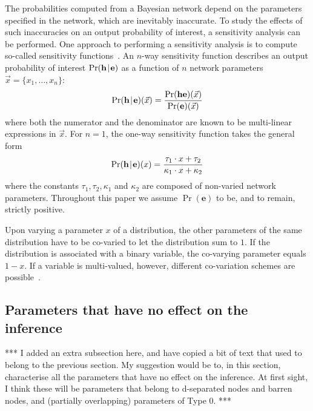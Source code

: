 \documentclass[10pt,a4paper]{paper}
\theoremstyle{definition}
\newcommand{\ct}[1]{\tau_{#1}}
\newcommand{\cn}[1]{\kappa_{#1}}
\newcommand{\hyp}{\mathbf{h}}
\newcommand{\ev}{\mathbf{e}}
\newcommand{\newmid}{\hspace{0.9pt}\vert\hspace{0.9pt}}
\begin{document}
The probabilities computed from a Bayesian network depend on the parameters specified in the network, which are inevitably inaccurate. To study the effects of such inaccuracies on an output probability of interest, a sensitivity analysis can be performed. One approach to performing a sensitivity analysis is to compute so-called sensitivity functions~\cite{Kjaerulff:2000ui}. 
An $n$-way sensitivity function describes an output probability of interest $\Pr(\hyp\newmid \ev)$ as a function of $n$ network parameters $\vec{x}=\{x_1,\ldots ,x_n\}$:
\begin{equation*}
\Pr(\hyp\newmid \ev)(\vec{x}) = \frac{\Pr(\hyp\ev)(\vec{x})}{\Pr(\ev)(\vec{x})}
\end{equation*}
where both the numerator and the denominator are known to be multi-linear expressions in $\vec{x}$. For $n=1$, the one-way sensitivity function takes the general form
\begin{equation*} 
\Pr(\hyp\newmid \ev)(x) = \frac{\ct{1}\cdot x+\ct{2}}{\cn{1}\cdot x+\cn{2}}
\end{equation*}
where the constants $\ct{1},\ct{2},\cn{1}$ and $\cn{2}$ are composed of non-varied network parameters. Throughout this paper we assume  $\Pr(\ev)$ to be, and to remain, strictly positive.

Upon varying a parameter $x$ of a distribution, the other parameters of the same distribution have to be co-varied to let the distribution sum to $1$. If the distribution is associated with a binary variable, the co-varying parameter equals $1-x$. If a variable is multi-valued, however, different co-variation schemes are possible~\cite{renooij20141022}.

\subsection{Parameters that have no effect on the inference}

{\color{red}*** I added an extra subsection here, and have copied a bit of text that used to belong to the previous section. My suggestion would be to, in this section, characterise all the parameters that have no effect on the inference. At first sight, I think these will be parameters that belong to d-separated nodes and barren nodes, and (partially overlapping) parameters of Type 0. ***}
\end{document}
